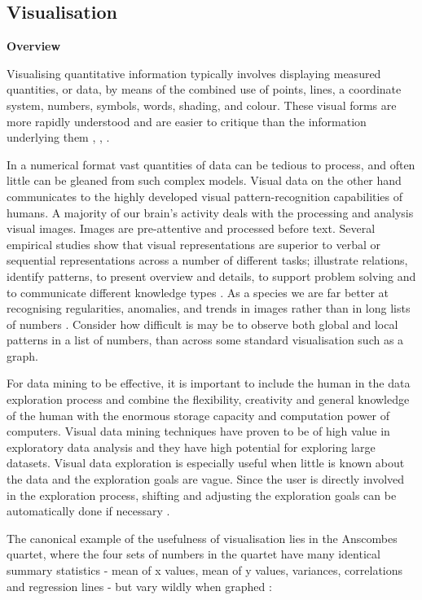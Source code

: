 \documentclass[a4paper,11pt,titlepage]{article}
\begin{document}
\subsection{Visualisation}

\textbf{Overview}

		Visualising quantitative information typically involves displaying measured quantities, or data, by means of the combined use of points, lines, a coordinate system, numbers, symbols, words, shading, and colour. These visual forms are more rapidly understood and are easier to critique than the information underlying them \cite{DeFanti1989}, \cite{McCormick1987}, \cite{Tufte2001}.
		\par
		In a numerical format vast quantities of data can be tedious to process, and often little can be gleaned from such complex models. Visual data on the other hand communicates to the highly developed visual pattern-recognition capabilities of humans. A majority of our brain's activity deals with the processing and analysis visual images. Images are pre-attentive and processed before text. Several empirical studies show that visual representations are superior to verbal or sequential representations across a number of different tasks; illustrate relations, identify patterns, to present overview and details, to support problem solving and to communicate different knowledge types \cite{Burkhard2004}. As a species we are far better at recognising regularities, anomalies, and trends in images rather than in long lists of numbers \cite{Ware2010}. Consider how difficult is may be to observe both global and local patterns in a list of numbers, than across some standard visualisation such as a graph.
		\par 
		For data mining to be effective, it is important to include the human in the data exploration process and combine the flexibility, creativity and general knowledge of the human with the enormous storage capacity and computation power of computers. Visual data mining techniques have proven to be of high value in exploratory data analysis and they have high potential for exploring large datasets. Visual data exploration is especially useful when little is known about the data and the exploration goals are vague. Since the user is directly involved in the exploration process, shifting and adjusting the exploration goals can be automatically done if necessary \cite{Keim2002}.
		\par 
		The canonical example of the usefulness of visualisation lies in the Anscombes quartet, where the four sets of numbers in the quartet have many identical summary statistics - mean of x values, mean of y values, variances, correlations and regression lines - but vary wildly when graphed \cite{Shoresh2011}:
\end{document}
